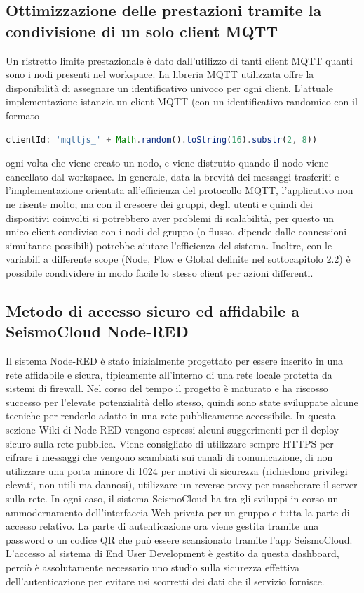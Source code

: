 \documentclass[a4paper,10pt]{memoir}
\begin{document}
\subsection{Ottimizzazione delle prestazioni tramite la condivisione di un solo client MQTT}

Un ristretto limite prestazionale è dato dall'utilizzo di tanti client MQTT quanti sono i nodi presenti nel workspace. La libreria MQTT utilizzata offre la disponibilità di assegnare un identificativo univoco per ogni client.
L'attuale implementazione istanzia un client MQTT (con un identificativo randomico con il formato 
\begin{lstlisting}[language=Javascript]
clientId: 'mqttjs_' + Math.random().toString(16).substr(2, 8))
\end{lstlisting}
ogni volta che viene creato un nodo, e viene distrutto quando il nodo viene cancellato dal workspace.
In generale, data la brevità dei messaggi trasferiti e l'implementazione orientata all'efficienza del protocollo MQTT, l'applicativo non ne risente molto; ma con il crescere dei gruppi, degli utenti e quindi dei dispositivi coinvolti si potrebbero aver problemi di scalabilità, per questo un unico client condiviso con i nodi del gruppo (o flusso, dipende dalle connessioni simultanee possibili) potrebbe aiutare l'efficienza del sistema.
Inoltre, con le variabili a differente scope (Node, Flow e Global definite nel sottocapitolo 2.2) è possibile condividere in modo facile lo stesso client per azioni differenti.

\subsection{Metodo di accesso sicuro ed affidabile a SeismoCloud Node-RED}

Il sistema Node-RED è stato inizialmente progettato per essere inserito in una rete affidabile e sicura, tipicamente all'interno di una rete locale protetta da sistemi di firewall. Nel corso del tempo il progetto è maturato e ha riscosso  successo per l'elevate potenzialità dello stesso, quindi sono state sviluppate alcune tecniche per renderlo adatto in una rete pubblicamente accessibile.
In questa sezione Wiki di Node-RED \cite{node-red-internet} vengono espressi alcuni suggerimenti per il deploy sicuro sulla rete pubblica.
Viene consigliato di utilizzare sempre HTTPS per cifrare i messaggi che vengono scambiati sui canali di comunicazione, di non utilizzare una porta minore di 1024 per motivi di sicurezza (richiedono privilegi elevati, non utili ma dannosi), utilizzare un reverse proxy per mascherare il server sulla rete. In ogni caso, il sistema SeismoCloud ha tra gli sviluppi in corso un ammodernamento dell'interfaccia Web privata per un gruppo e tutta la parte di accesso relativo. La parte di autenticazione ora viene gestita tramite una password o un codice QR che può essere scansionato tramite l'app SeismoCloud. L'accesso al sistema di End User Development è gestito da questa dashboard, perciò è assolutamente necessario uno studio sulla sicurezza effettiva dell'autenticazione per evitare usi scorretti dei dati che il servizio fornisce.
\end{document}
